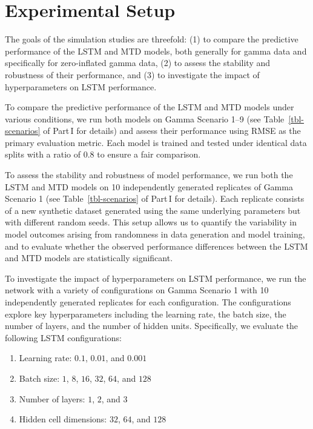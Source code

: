 \documentclass[
  letterpaper,
  double,
  12pt,
  1.0in]{beavtex}
\begin{document}
\section{Experimental Setup}\label{experimental-setup}

The goals of the simulation studies are threefold: (1) to compare the
predictive performance of the LSTM and MTD models, both generally for
gamma data and specifically for zero-inflated gamma data, (2) to assess
the stability and robustness of their performance, and (3) to
investigate the impact of hyperparameters on LSTM performance.

To compare the predictive performance of the LSTM and MTD models under
various conditions, we run both models on Gamma Scenario 1--9 (see
Table~\ref{tbl-scenarios} of Part\,I for details) and assess their
performance using RMSE as the primary evaluation metric. Each model is
trained and tested under identical data splits with a ratio of \(0.8\)
to ensure a fair comparison.

To assess the stability and robustness of model performance, we run both
the LSTM and MTD models on 10 independently generated replicates of
Gamma Scenario 1 (see Table~\ref{tbl-scenarios} of Part\,I for details).
Each replicate consists of a new synthetic dataset generated using the
same underlying parameters but with different random seeds. This setup
allows us to quantify the variability in model outcomes arising from
randomness in data generation and model training, and to evaluate
whether the observed performance differences between the LSTM and MTD
models are statistically significant.

To investigate the impact of hyperparameters on LSTM performance, we run
the network with a variety of configurations on Gamma Scenario 1 with 10
independently generated replicates for each configuration. The
configurations explore key hyperparameters including the learning rate,
the batch size, the number of layers, and the number of hidden units.
Specifically, we evaluate the following LSTM configurations:

\begin{enumerate}
\def\labelenumi{\arabic{enumi}.}
\item
  Learning rate: \(0.1\), \(0.01\), and \(0.001\)
\item
  Batch size: \(1\), \(8\), \(16\), \(32\), \(64\), and \(128\)
\item
  Number of layers: \(1\), \(2\), and \(3\)
\item
  Hidden cell dimensions: \(32\), \(64\), and \(128\)
\end{enumerate}
\end{document}

